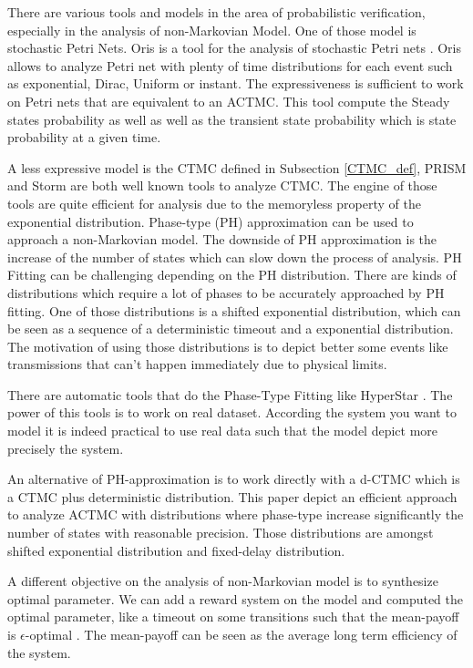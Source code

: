 There are various tools and models in the area of probabilistic verification, especially in the analysis of non-Markovian Model. One of those model is stochastic Petri Nets. Oris is a tool for the analysis of stochastic Petri nets \cite{Bucci2010}. Oris allows to analyze Petri net with plenty of time distributions for each event such as exponential, Dirac, Uniform or instant. The expressiveness is sufficient to work on Petri nets that are equivalent to an ACTMC. This tool compute the Steady states probability as well as well as the transient state probability which is state probability at a given time. 

A less expressive model is the CTMC defined in Subsection \ref{CTMC_def}, PRISM\cite{KNP11} and Storm \cite{DBLP:journals/corr/DehnertJK017} are both well known tools to analyze CTMC. The engine of those tools are quite efficient for analysis due to the memoryless property of the exponential distribution. Phase-type (PH) approximation can be used to approach a non-Markovian model. The downside of PH approximation is the increase of the number of states which can slow down the process of analysis.  PH Fitting can be challenging depending on the PH distribution\cite{DBLP:journals/corr/KorenciakKR14}.
There are kinds of distributions which require a lot of phases to be accurately approached by PH fitting. One of those distributions is a shifted exponential distribution, which can be seen as a sequence of a deterministic timeout and a exponential distribution. The motivation of using those distributions is to depict better some events like transmissions that can't happen immediately due to physical limits.

There are automatic tools that do the Phase-Type Fitting like HyperStar \cite{10.1007/978-3-642-40725-3_13}. The power of this tools is to work on real dataset. According the system you want to model it is indeed practical to use real data such that the model depict more precisely the system. 


An alternative of PH-approximation is to work directly with a d-CTMC which is a CTMC plus deterministic distribution. This paper \cite{DBLP:journals/corr/BaierDKKR17} depict an efficient approach to analyze ACTMC with distributions where phase-type increase significantly the number of states with reasonable precision. Those distributions are amongst shifted exponential distribution and fixed-delay distribution.

A different objective on the analysis of non-Markovian model is to synthesize optimal parameter. We can add a reward system on the model and computed the optimal parameter, like a timeout on some transitions such that the mean-payoff is $\epsilon$-optimal \cite{DBLP:journals/corr/BaierDKKR17}. The mean-payoff can be seen as the average long term efficiency of the system.